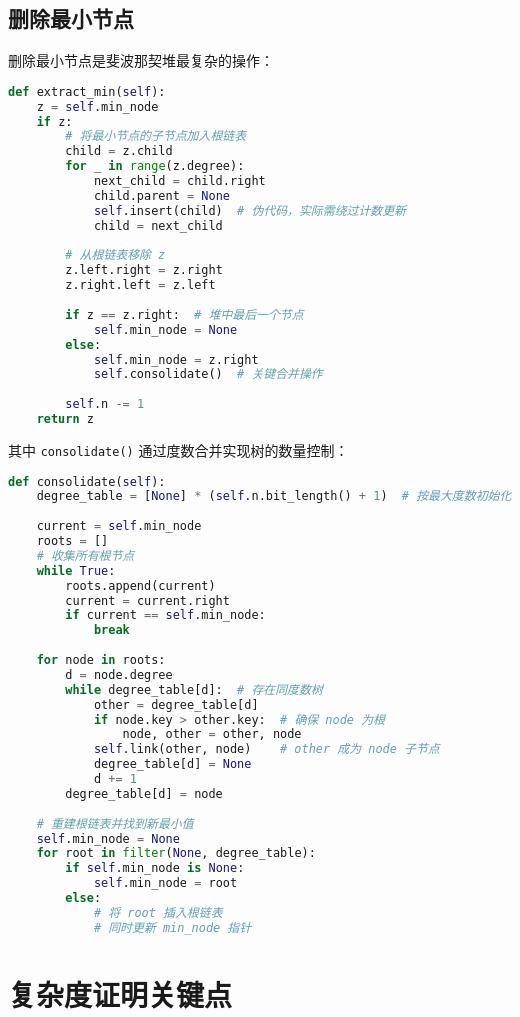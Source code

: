 \section{删除最小节点}
删除最小节点是斐波那契堆最复杂的操作：\par
\begin{lstlisting}[language=python]
def extract_min(self):
    z = self.min_node
    if z:
        # 将最小节点的子节点加入根链表
        child = z.child
        for _ in range(z.degree):
            next_child = child.right
            child.parent = None
            self.insert(child)  # 伪代码，实际需绕过计数更新
            child = next_child
        
        # 从根链表移除 z
        z.left.right = z.right
        z.right.left = z.left
        
        if z == z.right:  # 堆中最后一个节点
            self.min_node = None
        else:
            self.min_node = z.right
            self.consolidate()  # 关键合并操作
        
        self.n -= 1
    return z
\end{lstlisting}
其中 \texttt{consolidate()} 通过度数合并实现树的数量控制：\par
\begin{lstlisting}[language=python]
def consolidate(self):
    degree_table = [None] * (self.n.bit_length() + 1)  # 按最大度数初始化桶
    
    current = self.min_node
    roots = []
    # 收集所有根节点
    while True:
        roots.append(current)
        current = current.right
        if current == self.min_node:
            break
    
    for node in roots:
        d = node.degree
        while degree_table[d]:  # 存在同度数树
            other = degree_table[d]
            if node.key > other.key:  # 确保 node 为根
                node, other = other, node
            self.link(other, node)    # other 成为 node 子节点
            degree_table[d] = None
            d += 1
        degree_table[d] = node
    
    # 重建根链表并找到新最小值
    self.min_node = None
    for root in filter(None, degree_table):
        if self.min_node is None:
            self.min_node = root
        else:
            # 将 root 插入根链表
            # 同时更新 min_node 指针
\end{lstlisting}
\chapter{复杂度证明关键点}
